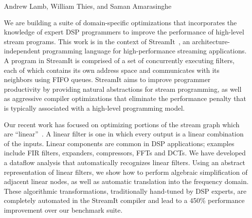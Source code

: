 \documentclass{csailabstractbook}
\begin{document}


         {Andrew Lamb, William Thies, and Saman Amarasinghe}



We are building a suite of domain-specific optimizations that
incorporates the knowledge of expert DSP programmers to improve the
performance of high-level stream programs.  This work is in the
context of StreamIt~\cite{streamit-www}, an architecture-independent
programming language for high-performance streaming applications.  A
program in StreamIt is comprised of a set of concurrently executing
filters, each of which contains its own address space and communicates
with its neighbors using FIFO queues.  StreamIt aims to improve
programmer productivity by providing natural abstractions for stream
programming, as well as aggressive compiler optimizations that
eliminate the performance penalty that is typically associated with a
high-level programming model.
	
Our recent work has focused on optimizing portions of the stream
graph which are ``linear''~\cite{lamb-thesis,lamb03}.  A linear filter
is one in which every output is a linear combination of the inputs.
Linear components are common in DSP applications; examples include FIR
filters, expanders, compressors, FFTs and DCTs.  We have developed a
dataflow analysis that automatically recognizes linear filters.  Using
an abstract representation of linear filters, we show how to perform
algebraic simplification of adjacent linear nodes, as well as
automatic translation into the frequency domain.  These algorithmic
transformations, traditionally hand-tuned by DSP experts, are
completely automated in the StreamIt compiler and lead to a 450\%
performance improvement over our benchmark suite.

\end{document}
